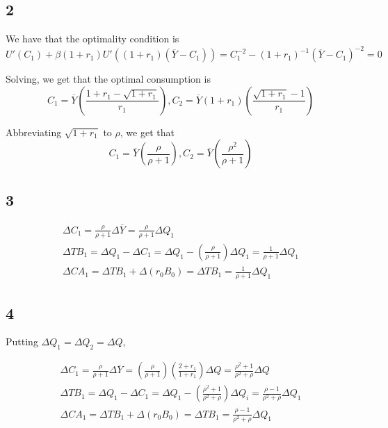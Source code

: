 \documentclass[12pt,letterpaper]{article}
\theoremstyle{definition}
\begin{document}
\subsection*{2}

We have that the optimality condition is
\[
  U'(C_1) + \beta(1+r_1) U'((1+r_1)(\overline{Y} - C_1)) = C_1^{-2} -
  (1+r_1)^{-1}(\overline{Y} - C_1)^{-2} = 0
\]

Solving, we get that the optimal consumption is
\[
  C_1 = \overline{Y}\left(\frac{1+r_1 - \sqrt{1+r_1}}{r_1}\right), C_2 = \overline{Y}(1+r_1)\left(\frac{\sqrt{1+r_1}-1}{r_1}\right)
\]

Abbreviating $\sqrt{1+r_1}$ to $\rho$, we get that
\[
  C_1 = \overline{Y}\left( \frac{\rho}{\rho+1} \right), C_2 = \overline{Y}\left( \frac{\rho^2}{\rho+1} \right)
\]


\subsection*{3}

\begin{gather*}
  \Delta C_1 = \frac{\rho}{\rho+1} \Delta \overline{Y} = 
    \frac{\rho}{\rho+1} \Delta Q_1 \\
  \Delta TB_1 = \Delta Q_1 - \Delta C_1 = \Delta Q_1 - \left(
    \frac{\rho}{\rho+1} \right)\Delta Q_1 = \frac{1}{\rho + 1}\Delta Q_1 \\
  \Delta CA_1 = \Delta TB_1 + \Delta(r_0B_0) = \Delta TB_1 = \frac{1}{\rho +
    1}\Delta Q_1
\end{gather*}

\subsection*{4}

Putting $\Delta Q_1 = \Delta Q_2 = \Delta Q$,

\begin{gather*}
  \Delta C_1 =  \frac{\rho}{\rho+1} \Delta \overline{Y} = \left(
    \frac{\rho}{\rho+1} \right)\left(\frac{2 + r_1}{1+r_1}\right)\Delta Q =
   \frac{\rho^2+1}{\rho^2 + \rho} \Delta Q \\
  \Delta TB_1 = \Delta Q_1 - \Delta C_1 = \Delta Q_1 - \left(
    \frac{\rho^2+1}{\rho^2+\rho} \right)\Delta Q_i = \frac{\rho-1}{\rho^2 + \rho}\Delta Q_1 \\
  \Delta CA_1 = \Delta TB_1 + \Delta(r_0B_0) = \Delta TB_1 = \frac{\rho-1}{\rho^2 + \rho}\Delta Q_1
\end{gather*}
\end{document}

